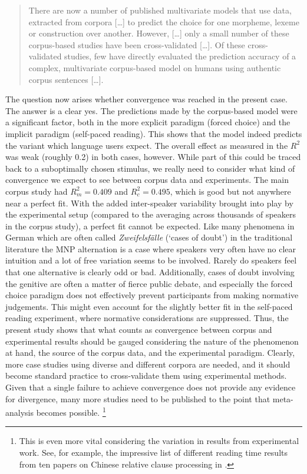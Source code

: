 \begin{quote}
  There are now a number of published multivariate models that use data, extracted from corpora [\ldots] to predict the choice for one morpheme, lexeme or construction over another.
  However, [\ldots] only a small number of these corpus-based studies have been cross-validated [\ldots].
  Of these cross- validated studies, few have directly evaluated the prediction accuracy of a complex, multivariate corpus-based model on humans using authentic corpus sentences [\ldots].
\end{quote}

The question now arises whether convergence was reached in the present case.
The answer is a clear yes.
The predictions made by the corpus-based model were a significant factor, both in the more explicit paradigm (forced choice) and the implicit paradigm (self-paced reading).
This shows that the model indeed predicts the variant which language users expect.
The overall effect as measured in the $R^2$ was weak (roughly 0.2) in both cases, however.
While part of this could be traced back to a suboptimally chosen stimulus, we really need to consider what kind of convergence we expect to see between corpus data and experiments.
The main corpus study had $R^2_m=0.409$ and $R^2_c=0.495$, which is good but not anywhere near a perfect fit.
With the added inter-speaker variability brought into play by the experimental setup (compared to the averaging across thousands of speakers in the corpus study), a perfect fit cannot be expected.
Like many phenomena in German which are often called \textit{Zweifelsfälle} (`cases of doubt') in the traditional literature \citep{Duden09,Klein2009} the MNP alternation is a case where speakers very often have no clear intuition and a lot of free variation seems to be involved.
Rarely do speakers feel that one alternative is clearly odd or bad.
Additionally, cases of doubt involving the genitive are often a matter of fierce public debate, and especially the forced choice paradigm does not effectively prevent participants from making normative judgements.
This might even account for the slightly better fit in the self-paced reading experiment, where normative considerations are suppressed.
Thus, the present study shows that what counts as convergence between corpus and experimental results should be gauged considering the nature of the phenomenon at hand, the source of the corpus data, and the experimental paradigm.
Clearly, more case studies using diverse and different corpora are needed, and it should become standard practice to cross-validate them using experimental methods.
Given that a single failure to achieve convergence does not provide any evidence for divergence, many more studies need to be published to the point that meta-analysis becomes possible.%
\footnote{This is even more vital considering the variation in results from experimental work.
See, for example, the impressive list of different reading time results from ten papers on Chinese relative clause processing in \citet[8]{Vasishth2015}.}

